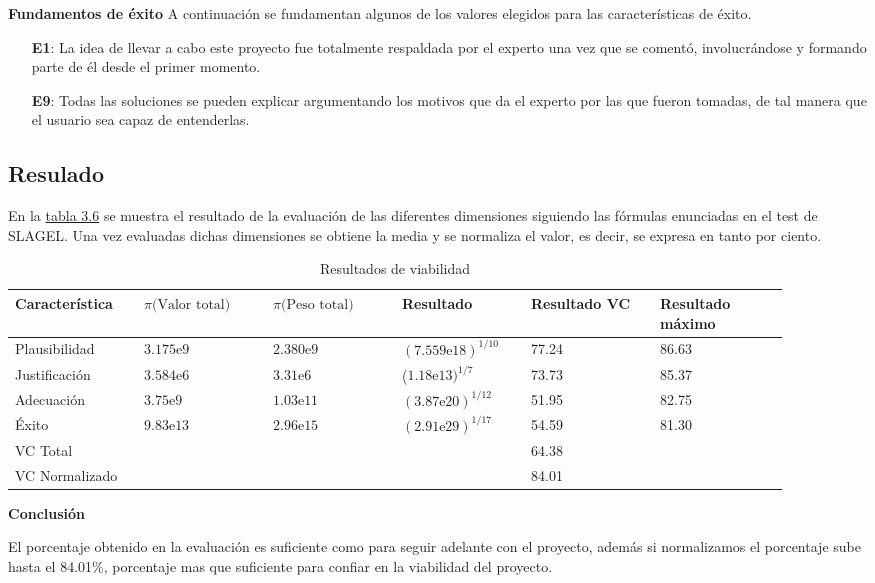 \textbf{Fundamentos de éxito}
A continuación se fundamentan algunos de los valores elegidos para las características de éxito.

\begin{enumerate}
  \item[\textbf{E1}:] La idea de llevar a cabo este proyecto fue totalmente respaldada
     por el experto una vez que se comentó, involucrándose y formando parte de él desde
     el primer momento.
  \item[\textbf{E9}:] Todas las soluciones se pueden explicar argumentando los motivos
     que da el experto por las que fueron tomadas, de tal manera que el usuario sea
     capaz de entenderlas.
\end{enumerate}

\subsection{Resulado}

En la \hyperref[tab:resultados viabilidad]{tabla 3.6} se muestra el resultado de la evaluación de las diferentes dimensiones
 siguiendo las fórmulas enunciadas en el test de SLAGEL. Una vez evaluadas dichas dimensiones
 se obtiene la media y se normaliza el valor, es decir, se expresa en tanto por ciento.

\begin{longtable}[htb]{ | p{0.15\linewidth} | p{0.15\linewidth} | p{0.15\linewidth} | p{0.15\linewidth} | p{0.15\linewidth} | p{0.15\linewidth} | }%
  \caption{Resultados de viabilidad}
  \label{tab:resultados viabilidad}

  \endfirsthead
  \endhead

  \hline
  Característica & $\pi\text{(Valor total)}$ & $\pi\text{(Peso total)}$ & Resultado & Resultado VC & Resultado máximo \\ \hline \hline
  Plausibilidad & $3.175\text{e}9$ & $2.380\text{e}9$ & $(7.559\text{e}18)^{1/10}$ & 77.24 & 86.63 \\ \hline
  Justificación & $3.584\text{e}6$  & $3.31\text{e}6$ & ($1.18\text{e}13)^{1/7}$ & 73.73 & 85.37 \\ \hline
  Adecuación & $3.75\text{e}9$ & $1.03\text{e}11$ & $(3.87\text{e}20)^{1/12}$ & 51.95 & 82.75 \\ \hline
  Éxito & $9.83\text{e}13$ & $2.96\text{e}15$ & $(2.91\text{e}29)^{1/17}$ & 54.59 & 81.30 \\ \hline \hline
  \multicolumn{4}{|l|}{VC Total} & \multicolumn{2}{l|}{64.38} \\ \hline
  \multicolumn{4}{|l|}{VC Normalizado} & \multicolumn{2}{l|}{84.01} \\ \hline

\end{longtable}

\textbf{Conclusión}

El porcentaje obtenido en la evaluación es suficiente como para seguir adelante
 con el proyecto, además si normalizamos el porcentaje sube hasta el 84.01\%, porcentaje
 mas que suficiente para confiar en la viabilidad del proyecto.

